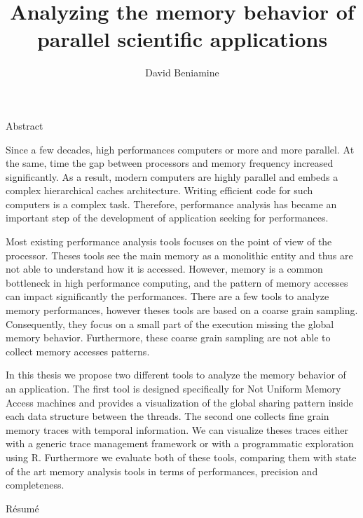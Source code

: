\documentclass[a4paper,10pt]{book}
\title{Analyzing the memory behavior of parallel scientific applications}
\author{David Beniamine}
\begin{document}
\frontmatter



\startcontents[smalltoc]

\begin{chapter}{Abstract}

    Since a few decades, high performances computers or more and more parallel.
    At the same, time the gap between processors and memory frequency increased significantly.
    As a result, modern computers are highly parallel and embeds a complex hierarchical caches architecture.
    Writing efficient code for such computers is a complex task.
    Therefore, performance analysis has became an important step of the development of application seeking for performances.

    Most existing performance analysis tools focuses on the point of view of the processor.
    Theses tools see the main memory as a monolithic entity and thus are not able to understand how it is accessed.
    However, memory is a common bottleneck in high performance computing, and the pattern of memory accesses can impact significantly the performances.
    There are a few tools to analyze memory performances, however theses tools are based on a coarse grain sampling.
    Consequently, they focus on a small part of the execution missing the global memory behavior.
    Furthermore, these coarse grain sampling are not able to collect memory accesses patterns.

    In this thesis we propose two different tools to analyze the memory behavior of an application.
    The first tool is designed specifically for Not Uniform Memory Access machines and provides a visualization of the global sharing pattern inside each data structure between the threads.
    The second one collects fine grain memory traces with temporal information.
    We can visualize theses traces either with a generic trace management framework or with a programmatic exploration using R.
    Furthermore we evaluate both of these tools, comparing them with state of the art memory analysis tools in terms of performances, precision and completeness.

\end{chapter}

\begin{chapter}{Résumé}
\end{chapter}



\listoftodos
\end{document}
